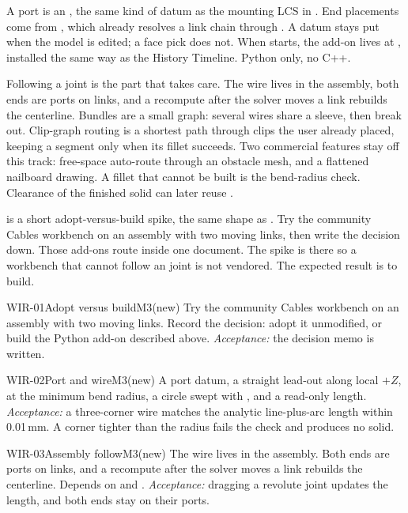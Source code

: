A port is an , the same kind of datum as the mounting LCS in
. End placements come from , which already resolves a
link chain through . A datum stays put when the model is edited; a face pick does not.
When  starts, the add-on lives at , installed the
same way as the History Timeline. Python only, no C++.

Following a joint is the part that takes care. The wire lives in the assembly, both ends are ports on
links, and a recompute after the solver moves a link rebuilds the centerline. Bundles are a small graph:
several wires share a sleeve, then break out. Clip-graph routing is a shortest path through clips the user
already placed, keeping a segment only when its fillet succeeds. Two commercial features stay off this
track: free-space auto-route through an obstacle mesh, and a flattened nailboard drawing. A fillet that
cannot be built is the bend-radius check. Clearance of the finished solid can later reuse
.

 is a short adopt-versus-build spike, the same shape as . Try the community
Cables workbench on an assembly with two moving links, then write the decision down. Those add-ons route
inside one document. The spike is there so a workbench that cannot follow an  joint is not
vendored. The expected result is to build.

\begin{epic}{WIR-01}{Adopt versus build}{M3}{\stTodo}{(new)}
Try the community Cables workbench on an assembly with two moving links. Record the decision: adopt it
unmodified, or build the Python add-on described above.
\emph{Acceptance:} the decision memo is written.
\end{epic}

\begin{epic}{WIR-02}{Port and wire}{M3}{\stTodo}{(new)}
A port datum, a straight lead-out along local $+Z$,  at the minimum bend radius, a circle
swept with , and a read-only length.
\emph{Acceptance:} a three-corner wire matches the analytic line-plus-arc length within 0.01\,mm. A corner
tighter than the radius fails the check and produces no solid.
\end{epic}

\begin{epic}{WIR-03}{Assembly follow}{M3}{\stTodo}{(new)}
The wire lives in the assembly. Both ends are ports on links, and a recompute after the solver moves a
link rebuilds the centerline. Depends on  and .
\emph{Acceptance:} dragging a revolute joint updates the length, and both ends stay on their ports.
\end{epic}

